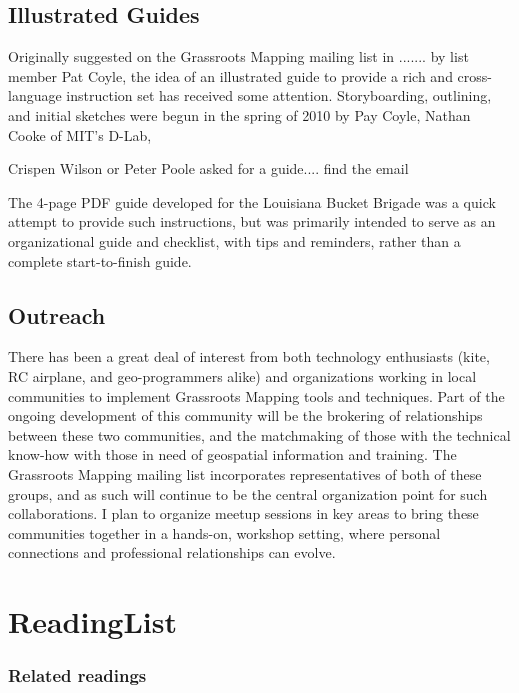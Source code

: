 \documentclass[11pt]{report}
\begin{document}

\section{Illustrated Guides}

Originally suggested on the Grassroots Mapping mailing list in ....... by list member Pat Coyle, the idea of an illustrated guide to provide a rich and cross-language instruction set has received some attention. Storyboarding, outlining, and initial sketches were begun in the spring of 2010 by Pay Coyle, Nathan Cooke of MIT's D-Lab, 

Crispen Wilson or Peter Poole asked for a guide.... find the email

The 4-page PDF guide developed for the Louisiana Bucket Brigade was a quick attempt to provide such instructions, but was primarily intended to serve as an organizational guide and checklist, with tips and reminders, rather than a complete start-to-finish guide. 

\section{Outreach}

There has been a great deal of interest from both technology enthusiasts (kite, RC airplane, and geo-programmers alike) and organizations working in local communities to implement Grassroots Mapping tools and techniques. Part of the ongoing development of this community will be the brokering of relationships between these two communities, and the matchmaking of those with the technical know-how with those in need of geospatial information and training. The Grassroots Mapping mailing list incorporates representatives of both of these groups, and as such will continue to be the central organization point for such collaborations. I plan to organize meetup sessions in key areas to bring these communities together in a hands-on, workshop setting, where personal connections and professional relationships can evolve.

\chapter{ReadingList}

\hypertarget{related_readings_1}{}\subsection*{{Related readings}}\label{related_readings_1}
\end{document}

